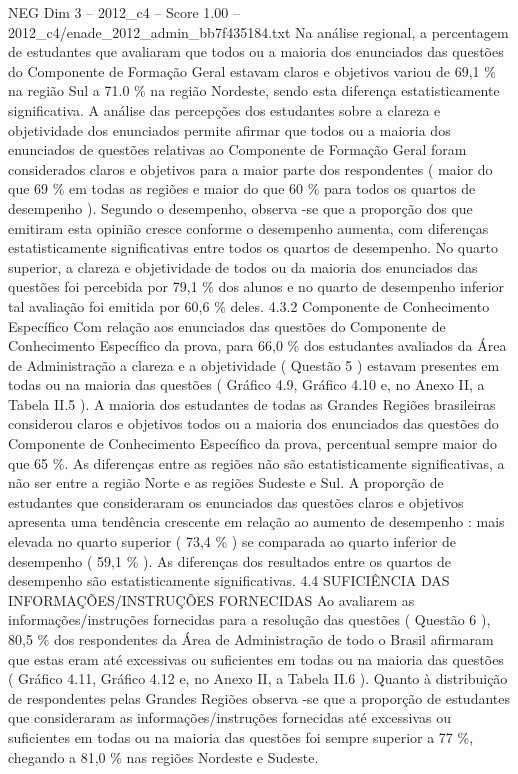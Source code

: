 \begin{textsample}{NEG Dim 3 – 2012\_c4 – Score 1.00 – 2012\_c4/enade\_2012\_admin\_bb7f435184.txt}
Na análise regional, a percentagem de estudantes que avaliaram que todos ou a maioria dos enunciados das questões do Componente de Formação Geral estavam claros e objetivos variou de 69,1 \% na região Sul a 71.0 \% na região Nordeste, sendo esta diferença estatisticamente significativa.
A análise das percepções dos estudantes sobre a clareza e objetividade dos enunciados permite afirmar que todos ou a maioria dos enunciados de questões relativas ao Componente de Formação Geral foram considerados claros e objetivos para a maior parte dos respondentes ( maior do que 69 \% em todas as regiões e maior do que 60 \% para todos os quartos de desempenho ).
Segundo o desempenho, observa -se que a proporção dos que emitiram esta opinião cresce conforme o desempenho aumenta, com diferenças estatisticamente significativas entre todos os quartos de desempenho.
No quarto superior, a clareza e objetividade de todos ou da maioria dos enunciados das questões foi percebida por 79,1 \% dos alunos e no quarto de desempenho inferior tal avaliação foi emitida por 60,6 \% deles. 4.3.2 Componente de Conhecimento Específico Com relação aos enunciados das questões do Componente de Conhecimento Específico da prova, para 66,0 \% dos estudantes avaliados da Área de Administração a clareza e a objetividade ( Questão 5 ) estavam presentes em todas ou na maioria das questões ( Gráfico 4.9, Gráfico 4.10 e, no Anexo II, a Tabela II.5 ).
A maioria dos estudantes de todas as Grandes Regiões brasileiras considerou claros e objetivos todos ou a maioria dos enunciados das questões do Componente de Conhecimento Específico da prova, percentual sempre maior do que 65 \%.
As diferenças entre as regiões não são estatisticamente significativas, a não ser entre a região Norte e as regiões Sudeste e Sul.
A proporção de estudantes que consideraram os enunciados das questões claros e objetivos apresenta uma tendência crescente em relação ao aumento de desempenho : mais elevada no quarto superior ( 73,4 \% ) se comparada ao quarto inferior de desempenho ( 59,1 \% ).
As diferenças dos resultados entre os quartos de desempenho são estatisticamente significativas. 4.4 SUFICIÊNCIA DAS INFORMAÇÕES/INSTRUÇÕES FORNECIDAS Ao avaliarem as informações/instruções fornecidas para a resolução das questões ( Questão 6 ), 80,5 \% dos respondentes da Área de Administração de todo o Brasil afirmaram que estas eram até excessivas ou suficientes em todas ou na maioria das questões ( Gráfico 4.11, Gráfico 4.12 e, no Anexo II, a Tabela II.6 ).
Quanto à distribuição de respondentes pelas Grandes Regiões observa -se que a proporção de estudantes que consideraram as informações/instruções fornecidas até excessivas ou suficientes em todas ou na maioria das questões foi sempre superior a 77 \%, chegando a 81,0 \% nas regiões Nordeste e Sudeste.

\end{textsample}
